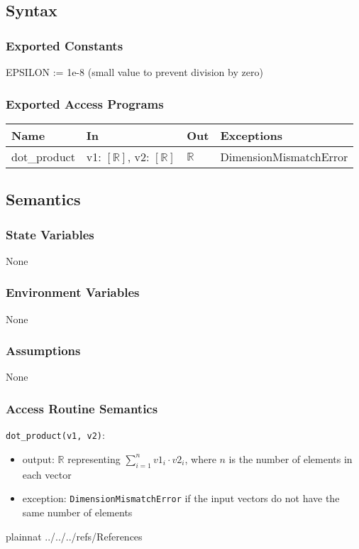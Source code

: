 \documentclass[12pt, titlepage]{article}
\begin{document}
\subsection{Syntax}

\subsubsection{Exported Constants}
EPSILON := 1e-8 (small value to prevent division by zero)
\subsubsection{Exported Access Programs}

\begin{center}
\begin{tabular}{p{2cm} p{4cm} p{4cm} p{4cm}}
\hline
\textbf{Name} & \textbf{In} & \textbf{Out} & \textbf{Exceptions} \\
\hline
dot\_product & v1: $[\mathbb{R}]$, v2: $[\mathbb{R}]$ & $\mathbb{R}$ & DimensionMismatchError \\

\hline
\end{tabular}
\end{center}

\subsection{Semantics}

\subsubsection{State Variables}
None

\subsubsection{Environment Variables}

None

\subsubsection{Assumptions}

None

\subsubsection{Access Routine Semantics}

\noindent \texttt{dot\_product(v1, v2)}:
\begin{itemize}
  \item output: $\mathbb{R}$ representing $\sum_{i=1}^{n} v1_i \cdot v2_i$, where $n$ is the number of elements in each vector
  \item exception: \texttt{DimensionMismatchError} if the input vectors do not have the same number of elements
\end{itemize}


\newpage

 {plainnat}
 {../../../refs/References}

\newpage

\newpage{}
\end{document}

